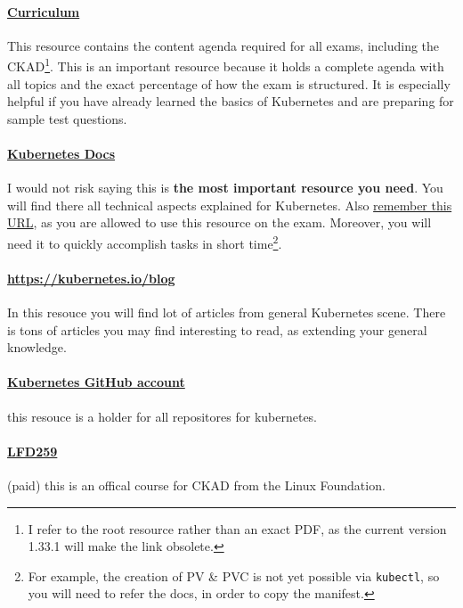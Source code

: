 \paragraph{\href{https://github.com/cncf/curriculum}{Curriculum}} 
This resource contains the content agenda required for all exams, including the CKAD\footnote{I refer to the root resource rather than an exact PDF, as the current version 1.33.1 will make the link obsolete.}. This is an important resource because it holds a complete agenda with all topics and the exact percentage of how the exam is structured. It is especially helpful if you have already learned the basics of Kubernetes and are preparing for sample test questions.

\paragraph{\href{https://kubernetes.io/docs}{Kubernetes Docs}} I would not risk saying this is \textbf{the most important resource you need}. You will find there all technical aspects explained for Kubernetes. Also \underline{remember this URL}, as you are allowed to use this resource on the exam. Moreover, you will need it to quickly accomplish tasks in short time\footnote{For example, the creation of PV \& PVC is not yet possible via \texttt{kubectl}, so you will need to refer the docs, in order to copy the manifest.}.

\paragraph{\href{https://kubernetes.io/blog}{https://kubernetes.io/blog}} In this resouce you will find lot of articles from general Kubernetes scene. There is tons of articles you may find interesting to read, as extending your general knowledge. 

\paragraph{\href{https://github.com/kubernetes/}{Kubernetes GitHub account}} this resouce is a holder for all repositores for kubernetes.

\paragraph{\href{https://training.linuxfoundation.org/training/kubernetes-for-developers/}{LFD259}} (paid) this is an offical course for CKAD from the Linux Foundation.


